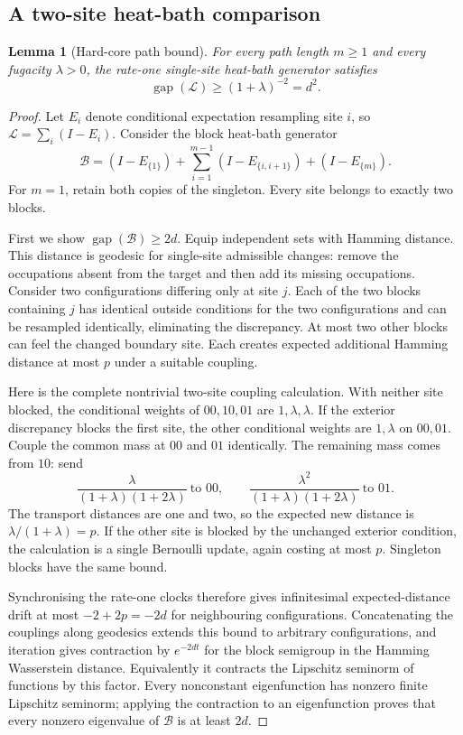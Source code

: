 \documentclass[11pt,a4paper]{article}
\newtheorem{lemma}[theorem]{Lemma}
\theoremstyle{remark}\newtheorem{remark}[theorem]{Remark}
\newcommand{\gap}{\operatorname{gap}}
\begin{document}
\subsection{A two-site heat-bath comparison}
\begin{lemma}[Hard-core path bound]\label{lem:hardcore}
For every path length $m\ge1$ and every fugacity $\lambda>0$, the rate-one single-site heat-bath generator satisfies
\begin{equation}\label{eq:hardcore-gap}
 \gap(\mathcal L)\ge(1+\lambda)^{-2}=d^2.
\end{equation}
\end{lemma}
\begin{proof}
Let $E_i$ denote conditional expectation resampling site $i$, so
$\mathcal L=\sum_i(I-E_i)$. Consider the block heat-bath generator
\[
 \mathcal B=(I-E_{\{1\}})+\sum_{i=1}^{m-1}(I-E_{\{i,i+1\}})
                 +(I-E_{\{m\}}).
\]
For $m=1$, retain both copies of the singleton. Every site belongs to exactly two blocks.

First we show $\gap(\mathcal B)\ge2d$. Equip independent sets with Hamming distance. This distance is geodesic for single-site admissible changes: remove the occupations absent from the target and then add its missing occupations. Consider two configurations differing only at site $j$. Each of the two blocks containing $j$ has identical outside conditions for the two configurations and can be resampled identically, eliminating the discrepancy. At most two other blocks can feel the changed boundary site. Each creates expected additional Hamming distance at most $p$ under a suitable coupling.

Here is the complete nontrivial two-site coupling calculation. With neither site blocked, the conditional weights of $00,10,01$ are $1,\lambda,\lambda$. If the exterior discrepancy blocks the first site, the other conditional weights are $1,\lambda$ on $00,01$. Couple the common mass at $00$ and $01$ identically. The remaining mass comes from $10$: send
\[
 \frac{\lambda}{(1+\lambda)(1+2\lambda)}\ \text{to }00,
 \qquad
 \frac{\lambda^2}{(1+\lambda)(1+2\lambda)}\ \text{to }01.
\]
The transport distances are one and two, so the expected new distance is
$\lambda/(1+\lambda)=p$. If the other site is blocked by the unchanged exterior condition, the calculation is a single Bernoulli update, again costing at most $p$. Singleton blocks have the same bound.

Synchronising the rate-one clocks therefore gives infinitesimal expected-distance drift at most $-2+2p=-2d$ for neighbouring configurations. Concatenating the couplings along geodesics extends this bound to arbitrary configurations, and iteration gives contraction by $e^{-2dt}$ for the block semigroup in the Hamming Wasserstein distance. Equivalently it contracts the Lipschitz seminorm of functions by this factor. Every nonconstant eigenfunction has nonzero finite Lipschitz seminorm; applying the contraction to an eigenfunction proves that every nonzero eigenvalue of $\mathcal B$ is at least $2d$.


\end{proof}
\end{document}
